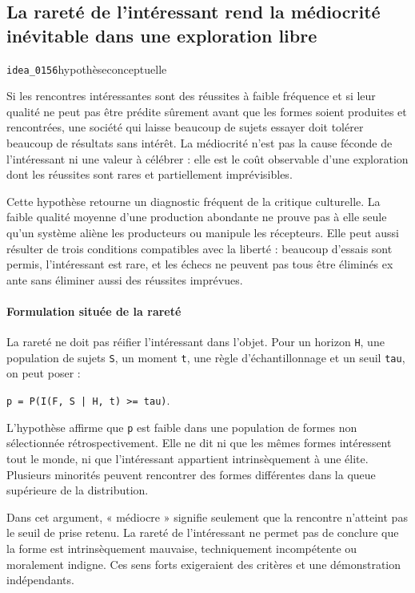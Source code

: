 \documentclass[10pt,a4paper]{article}
\begin{document}
\subsection{La rareté de l'intéressant rend la médiocrité inévitable dans une exploration libre}
{\small\color{metadata} \texttt{idea\_0156}\quad\textbullet\quad hypothèse\quad\textbullet\quad conceptuelle\par}

Si les rencontres intéressantes sont des réussites à faible fréquence et si leur qualité ne peut pas être prédite sûrement avant que les formes soient produites et rencontrées, une société qui laisse beaucoup de sujets essayer doit tolérer beaucoup de résultats sans intérêt. La médiocrité n'est pas la cause féconde de l'intéressant ni une valeur à célébrer : elle est le coût observable d'une exploration dont les réussites sont rares et partiellement imprévisibles.

Cette hypothèse retourne un diagnostic fréquent de la critique culturelle. La faible qualité moyenne d'une production abondante ne prouve pas à elle seule qu'un système aliène les producteurs ou manipule les récepteurs. Elle peut aussi résulter de trois conditions compatibles avec la liberté : beaucoup d'essais sont permis, l'intéressant est rare, et les échecs ne peuvent pas tous être éliminés ex ante sans éliminer aussi des réussites imprévues.

\paragraph{Formulation située de la rareté}
La rareté ne doit pas réifier l'intéressant dans l'objet. Pour un horizon \texttt{H}, une population de sujets \texttt{S}, un moment \texttt{t}, une règle d'échantillonnage et un seuil \texttt{tau}, on peut poser :

\texttt{p = P(I(F, S | H, t) >= tau)}.

L'hypothèse affirme que \texttt{p} est faible dans une population de formes non sélectionnée rétrospectivement. Elle ne dit ni que les mêmes formes intéressent tout le monde, ni que l'intéressant appartient intrinsèquement à une élite. Plusieurs minorités peuvent rencontrer des formes différentes dans la queue supérieure de la distribution.

Dans cet argument, « médiocre » signifie seulement que la rencontre n'atteint pas le seuil de prise retenu. La rareté de l'intéressant ne permet pas de conclure que la forme est intrinsèquement mauvaise, techniquement incompétente ou moralement indigne. Ces sens forts exigeraient des critères et une démonstration indépendants.
\end{document}
